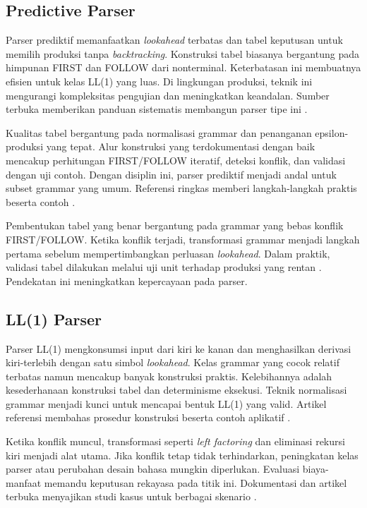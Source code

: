 \documentclass[../main.tex]{subfiles}
\begin{document}
\subsection{Predictive Parser}
Parser prediktif memanfaatkan \emph{lookahead} terbatas dan tabel keputusan untuk memilih produksi tanpa \emph{backtracking}. Konstruksi tabel biasanya bergantung pada himpunan FIRST dan FOLLOW dari nonterminal. Keterbatasan ini membuatnya efisien untuk kelas LL(1) yang luas. Di lingkungan produksi, teknik ini mengurangi kompleksitas pengujian dan meningkatkan keandalan. Sumber terbuka memberikan panduan sistematis membangun parser tipe ini \citep{WikiPredictiveParser}.

Kualitas tabel bergantung pada normalisasi grammar dan penanganan epsilon-produksi yang tepat. Alur konstruksi yang terdokumentasi dengan baik mencakup perhitungan FIRST/FOLLOW iteratif, deteksi konflik, dan validasi dengan uji contoh. Dengan disiplin ini, parser prediktif menjadi andal untuk subset grammar yang umum. Referensi ringkas memberi langkah-langkah praktis beserta contoh \citep{WikiFirstFollow,WikiPredictiveParser}.

Pembentukan tabel yang benar bergantung pada grammar yang bebas konflik FIRST/FOLLOW. Ketika konflik terjadi, transformasi grammar menjadi langkah pertama sebelum mempertimbangkan perluasan \emph{lookahead}. Dalam praktik, validasi tabel dilakukan melalui uji unit terhadap produksi yang rentan \citep{WikiPredictiveParser}. Pendekatan ini meningkatkan kepercayaan pada parser.

\subsection{LL(1) Parser}
Parser LL(1) mengkonsumsi input dari kiri ke kanan dan menghasilkan derivasi kiri-terlebih dengan satu simbol \emph{lookahead}. Kelas grammar yang cocok relatif terbatas namun mencakup banyak konstruksi praktis. Kelebihannya adalah kesederhanaan konstruksi tabel dan determinisme eksekusi. Teknik normalisasi grammar menjadi kunci untuk mencapai bentuk LL(1) yang valid. Artikel referensi membahas prosedur konstruksi beserta contoh aplikatif \citep{WikiLL}.

Ketika konflik muncul, transformasi seperti \emph{left factoring} dan eliminasi rekursi kiri menjadi alat utama. Jika konflik tetap tidak terhindarkan, peningkatan kelas parser atau perubahan desain bahasa mungkin diperlukan. Evaluasi biaya-manfaat memandu keputusan rekayasa pada titik ini. Dokumentasi dan artikel terbuka menyajikan studi kasus untuk berbagai skenario \citep{WikiLL,CS143}.
\end{document}
